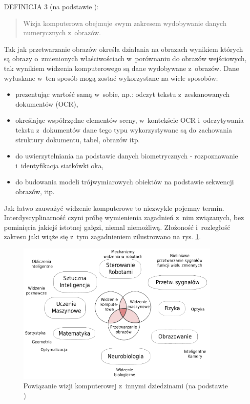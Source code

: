 DEFINICJA 3 (na podstawie \cite{morris2004computer}):

\blockquote{Wizja komputerowa obejmuje swym zakresem wydobywanie
danych numerycznych z~obrazów.}

Tak jak przetwarzanie obrazów określa działania na obrazach wynikiem
których są obrazy o~zmienionych właściwościach w~porównaniu do obrazów
wejściowych, tak wynikiem widzenia komputerowego są dane wydobywane
z~obrazów. Dane wyłuskane w~ten sposób mogą zostać wykorzystane
na wiele sposobów:
\begin{itemize}
    \item prezentując wartość samą w~sobie, np.: odczyt tekstu
        z~zeskanowanych dokumentów (OCR),
    \item określając współrzędne elementów sceny, w~kontekście OCR 
        i~odczytywania tekstu z~dokumentów dane tego typu
        wykorzystywane są do zachowania struktury dokumentu, tabel,
        obrazów itp.
    \item do uwierzytelniania na podstawie danych biometrycznych - 
        rozpoznawanie i~identyfikacja siatkówki oka,
    \item do budowania modeli trójwymiarowych obiektów na podstawie 
        sekwencji obrazów, itp.
\end{itemize}

Jak łatwo zauważyć widzenie komputerowe to niezwykle pojemny termin.
Interdyscyplinarność czyni próbę wymienienia zagadnień z~nim związanych,
bez pominięcia jakiejś istotnej gałęzi, niemal niemożliwą. 
Złożoność i~rozległość zakresu jaki wiąże się
z~tym zagadnieniem zilustrowano na rys. \ref{fig:int_cv_inter_discip}.

\begin{figure}[!h]
    \centering
    \includegraphics[width=0.9\textwidth]{img/int_cv_inter_discip}
    \caption{Powiązanie wizji komputerowej z~innymi dziedzinami 
        (na podstawie \cite{wiki:computervision})}
    \label{fig:int_cv_inter_discip}
\end{figure}

